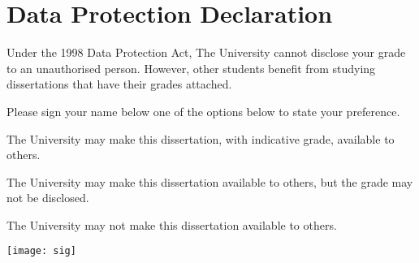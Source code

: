 
\section*{Data Protection Declaration}
\vspace{0.5cm}
\begin{flushleft}
Under the 1998 Data Protection Act, The University cannot disclose your grade to an unauthorised person. However, other students benefit from studying dissertations that have their grades attached. \newline

\vspace{0.5cm}

Please sign your name below one of the options below to state your preference.\newline
\vspace{0.5cm}

The University may make this dissertation, with indicative grade, available to others.\newline

\vspace{0.5cm}


The University may make this dissertation available to others, but the grade may not be disclosed.\newline
\vspace{0.5cm}


The University may not make this dissertation available to others.\newline

\texttt{[image: sig]}

\end{flushleft}

